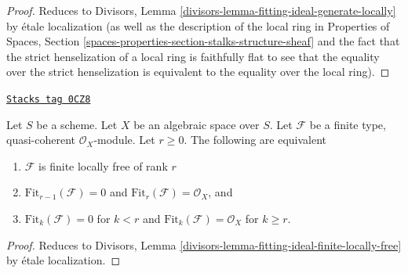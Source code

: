 \begin{proof}
Reduces to
Divisors, Lemma \ref{divisors-lemma-fitting-ideal-generate-locally}
by \'etale localization (as well as the description of the local
ring in Properties of Spaces, Section
\ref{spaces-properties-section-stalks-structure-sheaf}
and the fact that the strict henselization of a local ring
is faithfully flat to see that the equality over the strict
henselization is equivalent to the equality over the local ring).
\end{proof}

\begin{lemma}
\label{spaces-divisors-lemma-fitting-ideal-finite-locally-free}
\href{https://stacks.math.columbia.edu/tag/0CZ8}{\texttt{Stacks tag 0CZ8}}

Let $S$ be a scheme. Let $X$ be an algebraic space over $S$.
Let $\mathcal{F}$ be a finite type, quasi-coherent
$\mathcal{O}_X$-module. Let $r \geq 0$. The following are equivalent
\begin{enumerate}
\item $\mathcal{F}$ is finite locally free of rank $r$
\item $\text{Fit}_{r - 1}(\mathcal{F}) = 0$ and
$\text{Fit}_r(\mathcal{F}) = \mathcal{O}_X$, and
\item $\text{Fit}_k(\mathcal{F}) = 0$ for $k < r$ and
$\text{Fit}_k(\mathcal{F}) = \mathcal{O}_X$ for $k \geq r$.
\end{enumerate}
\end{lemma}

\begin{proof}
Reduces to
Divisors, Lemma \ref{divisors-lemma-fitting-ideal-finite-locally-free}
by \'etale localization.
\end{proof}

